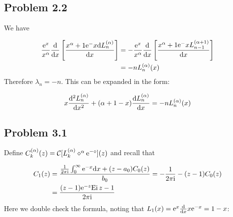 \documentclass[12pt,a4paper]{article}
\def\D{ {\rm d} }
\def\I{ {\rm i} }
\def\E{ {\rm e} }
\def\CC{ {\cal C} }
\def\Ei{ {\rm Ei}\, }
\def\dx{\D x}
\def\br[#1]{\left[{#1}\right]}
\begin{document}
\subsection{Problem 2.2}
We have


\begin{align*}
{\E^x \over x^\alpha} {\D \over \dx} \br[x^{\alpha+1} \E^{-x} {\D L_n^{(\alpha)} \over \dx}] &= -{\E^x \over x^\alpha} {\D \over \dx} \br[x^{\alpha+1} \E^{-x} { L_{n-1}^{(\alpha+1)} \over \dx}] \\
&= -n L_{n}^{(\alpha)}(x) 
\end{align*}
Therefore $\lambda_n = -n$. This can be expanded in the form:

\[
x {\D^2 L_n^{(\alpha)} \over \dx^2} + (\alpha+1 - x) {\D L_n^{(\alpha)} \over \dx} = -n L_n^{(\alpha)}(x)
\]
\subsection{Problem 3.1}
Define $C_k^{(\alpha)}(z) = \CC[L_k^{(\alpha)} \diamond^\alpha \E^{-\diamond}](z)$ and recall that 


\begin{align*}
C_1(z)  &= {{1 \over 2 \pi \I} \int_0^\infty \E^{-x} \dx + (z-a_0) C_0(z) \over b_0} = -{1 \over 2 \pi \I}  - (z-1) C_0(z)    \\
&= {(z-1) \E^{-z} \Ei z -1 \over 2 \pi \I} 
\end{align*}
Here we double check the formula, noting that $L_1(x) = \E^x {\D \over \dx} x \E^{-x} = 1 - x$:
\end{document}
